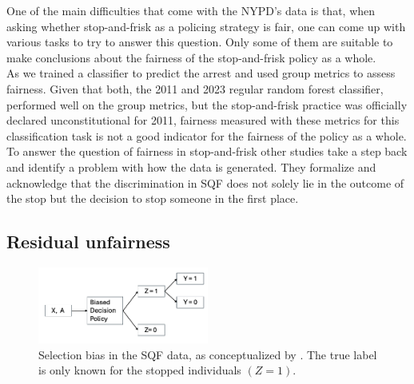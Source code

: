One of the main difficulties that come with the NYPD's data is that, when asking whether stop-and-frisk as a policing strategy is fair, one can come up with various tasks to try to answer this question. Only some of them are suitable to make conclusions about the fairness of the stop-and-frisk policy as a whole.\\
As \cite{Badr2022DTFANSP} we trained a classifier to predict the arrest and used group metrics to assess fairness. Given that both, the 2011 and 2023 regular random forest classifier, performed well on the group metrics, but the stop-and-frisk practice was officially declared unconstitutional for 2011, fairness measured with these metrics for this classification task is not a good indicator for the fairness of the policy as a whole.\\
To answer the question of fairness in stop-and-frisk other studies take a step back and identify a problem with how the data is generated. They formalize and acknowledge that the discrimination in SQF does not solely lie in the outcome of the stop but the decision to stop someone in the first place.

\subsection{Residual unfairness}
\begin{figure}[h]
    \includegraphics[width=0.5\textwidth]{../figures/selection_bias.png}
    \caption{Selection bias in the SQF data, as conceptualized by \cite{kallus2018}. The true label is only known for the stopped individuals $(Z = 1)$.}
    \label{fig:selection_bias}
\end{figure}

